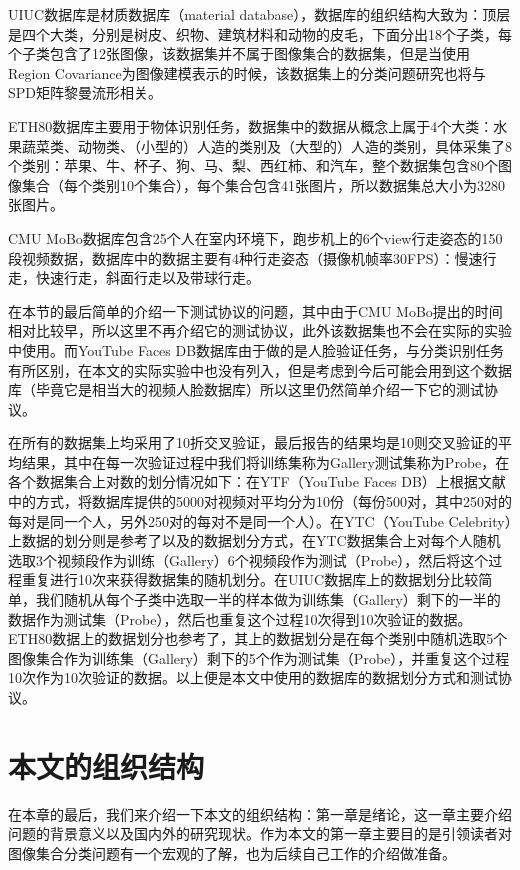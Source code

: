 UIUC数据库\cite{Database_UIUC}是材质数据库（material database），数据库的组织结构大致为：顶层是四个大类，分别是树皮、织物、建筑材料和动物的皮毛，下面分出18个子类，每个子类包含了12张图像，该数据集并不属于图像集合的数据集，但是当使用Region Covariance为图像建模表示的时候，该数据集上的分类问题研究也将与SPD矩阵黎曼流形相关。

ETH80数据库\cite{Database_ETH80}主要用于物体识别任务，数据集中的数据从概念上属于4个大类：水果蔬菜类、动物类、（小型的）人造的类别及（大型的）人造的类别，具体采集了8个类别：苹果、牛、杯子、狗、马、梨、西红柿、和汽车，整个数据集包含80个图像集合（每个类别10个集合），每个集合包含41张图片，所以数据集总大小为3280张图片。

CMU MoBo数据库\cite{Database_MoBo}包含25个人在室内环境下，跑步机上的6个view行走姿态的150段视频数据，数据库中的数据主要有4种行走姿态（摄像机帧率30FPS）：慢速行走，快速行走，斜面行走以及带球行走。

在本节的最后简单的介绍一下测试协议的问题，其中由于CMU MoBo\cite{Database_MoBo}提出的时间相对比较早，所以这里不再介绍它的测试协议，此外该数据集也不会在实际的实验中使用。而YouTube Faces DB数据库由于做的是人脸验证任务，与分类识别任务有所区别，在本文的实际实验中也没有列入，但是考虑到今后可能会用到这个数据库（毕竟它是相当大的视频人脸数据库）所以这里仍然简单介绍一下它的测试协议。

在所有的数据集上均采用了10折交叉验证，最后报告的结果均是10则交叉验证的平均结果，其中在每一次验证过程中我们将训练集称为Gallery测试集称为Probe，在各个数据集合上对数的划分情况如下：在YTF（YouTube Faces DB）上根据文献\cite{Database_YTF}中的方式，将数据库提供的5000对视频对平均分为10份（每份500对，其中250对的每对是同一个人，另外250对的每对不是同一个人）。在YTC（YouTube Celebrity）\cite{Database_YTC}上数据的划分则是参考了\cite{Statistics_CDL}以及\cite{Statistics_Vemu}的数据划分方式，在YTC数据集合上对每个人随机选取3个视频段作为训练（Gallery）6个视频段作为测试（Probe），然后将这个过程重复进行10次来获得数据集的随机划分。在UIUC数据库\cite{Database_UIUC}上的数据划分比较简单，我们随机从每个子类中选取一半的样本做为训练集（Gallery）剩下的一半的数据作为测试集（Probe），然后也重复这个过程10次得到10次验证的数据。ETH80数据上的数据划分也参考了\cite{Statistics_CDL}，其上的数据划分是在每个类别中随机选取5个图像集合作为训练集（Gallery）剩下的5个作为测试集（Probe），并重复这个过程10次作为10次验证的数据。以上便是本文中使用的数据库的数据划分方式和测试协议。
\section{本文的组织结构}
\label{sec:struct}
在本章的最后，我们来介绍一下本文的组织结构：第一章是绪论，这一章主要介绍问题的背景意义以及国内外的研究现状。作为本文的第一章主要目的是引领读者对图像集合分类问题有一个宏观的了解，也为后续自己工作的介绍做准备。

